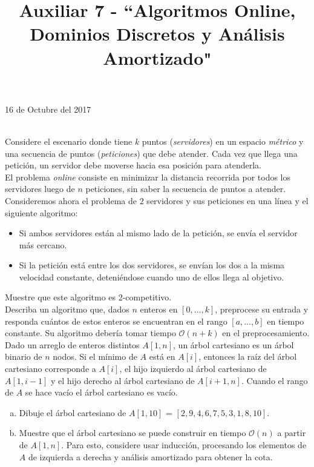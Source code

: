 \documentclass[dcc,uchile]{fcfmcourse}
\title{Auxiliar 7 - ``Algoritmos Online, Dominios Discretos y Análisis Amortizado"}
\theoremstyle{plain}
\theoremstyle{definition}
\begin{document}
\maketitle
\begin{center}
16 de Octubre del 2017
\end{center}


\vspace{-1ex}


\begin{problems}
\\
Considere el escenario donde tiene $k$ puntos (\textit{servidores}) en un espacio \textit{métrico} y una secuencia de puntos (\textit{peticiones}) que debe atender. Cada vez que llega una petición, un servidor debe moverse hacia esa posición para atenderla.\\
El problema \textit{online} consiste en minimizar la distancia recorrida por todos los servidores luego de $n$ peticiones, sin saber la secuencia de puntos a atender.\\
Consideremos ahora el problema de $2$ servidores y sus peticiones en una línea y el siguiente algoritmo:
    \begin{itemize}
        \item Si ambos servidores están al mismo lado de la petición, se envía el servidor más cercano.
        \item Si la petición está entre los dos servidores, se envían los dos a la misma velocidad constante, deteniéndose cuando uno de ellos llega al objetivo.
    \end{itemize}
    Muestre que este algoritmo es 2-competitivo.
    \\ Describa un algoritmo que, dados $n$ enteros en $[0, \ldots, k]$, preprocese su entrada y responda cuántos de estos enteros se encuentran en el rango $[a, \ldots, b]$ en tiempo constante. Su algoritmo debería tomar tiempo $\mathcal{O}(n + k)$ en el preprocesamiento.
\\
Dado un arreglo de enteros distintos $A[1, n]$, un árbol cartesiano es un árbol binario de $n$ nodos. Si el mínimo de $A$ está en $A[i]$, entonces la raíz del árbol cartesiano corresponde a $A[i]$, el hijo izquierdo al árbol cartesiano de $A[1, i − 1]$ y el hijo derecho al árbol cartesiano
de $A[i + 1, n]$. Cuando el rango de $A$ se hace vacío el árbol cartesiano es vacío.
\begin{enumerate}[a)]
    \item Dibuje el árbol cartesiano de $A[1, 10]$ = $[2, 9, 4, 6, 7, 5, 3, 1, 8, 10]$.
    \item Muestre que el árbol cartesiano se puede construir en tiempo $\mathcal{O}(n)$ a partir de $A[1, n]$. Para esto, considere usar inducción, procesando los elementos de $A$ de izquierda a derecha y análisis amortizado para obtener la cota.
\end{enumerate}
\end{problems}
\end{document}
